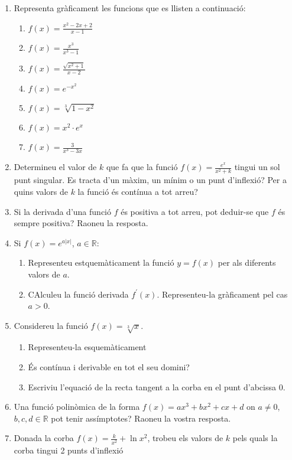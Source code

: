 \documentclass{article}
\begin{document}
	\author{Mireia Dosil}
	\date{text}





\begin{enumerate}
	\item Representa gràficament les funcions que es llisten a continuació:


\begin{enumerate}
	\item $f(x)=\frac{x^2-2x+2}{x-1}$
	\item $f(x)=\frac{x^3}{x^3-1}$
	\item $f(x)=\frac{\sqrt{x^2+1}}{x-2}$
	\item $f(x)=e^{-x^2}$
	\item $f(x)=\sqrt[3]{1-x^2}$
	\item $f(x)=x^2\cdot e^x$
	\item $f(x)=\frac{3}{x^3-3x}$
	\end{enumerate}

\item Determineu el valor de $k$ que fa que la funció $f(x)=\frac{e^x}{x^2+k}$ tingui un sol punt singular. Es tracta d'un màxim, un mínim o un punt d'inflexió? Per a quins valors de $k$ la funció és contínua a tot arreu?
\item Si la derivada d'una funció $f$ és positiva a tot arreu, pot deduir-se que $f$ és sempre positiva? Raoneu la resposta.

\item  Si $f(x)=e^{a|x|}$, $a \in \mathbb{R}$:
\begin{enumerate}
	\item Representeu estquemàticament la funció $y=f(x)$ per als diferents valors de $a$.
	\item CAlculeu la funció derivada $f^\prime (x)$. Representeu-la gràficament pel cas $a>0$.
\end{enumerate}

\item Considereu la funció $f(x)=\sqrt[3]{x}$.
\begin{enumerate}
	\item Representeu-la esquemàticament
	\item És contínua i derivable en tot el seu domini?
	\item Escriviu l'equació de la recta tangent a la corba en el punt d'abcissa $0$.
\end{enumerate}

\item  Una funció polinòmica de la forma $f(x)=ax^3+bx^2+cx+d$ on $a \ne 0$, $b, c,d \in \mathbb{R}$ pot tenir assímptotes? Raoneu la vostra resposta.

\item Donada la corba $f(x)=\frac{k}{x^2}+ \ln x^2$, trobeu els valors de $k$ pels quals la corba tingui 2 punts d'inflexió


\end{enumerate}

 
\end{document}
